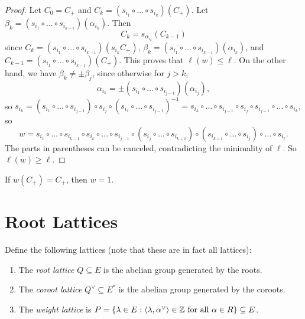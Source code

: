 \begin{proof}
  Let $C_0 = C_+$ and
  $C_k = (s_{i_1} \circ \dots \circ s_{i_k})(C_+)$.
  Let $\beta_k = (s_{i_1} \circ \dots \circ s_{i_{k - 1}})(\alpha_{i_k})$.
  Then
  \[
    C_k = s_{\alpha_{i_k}}(C_{k - 1})
  \]
  since
  $C_k = (s_{i_1} \circ \dots \circ s_{i_{k - 1}})(s_{i_k} C_+)$,
  $\beta_k = (s_{i_1} \circ \dots \circ s_{i_{k - 1}})(\alpha_{i_k})$,
  and $C_{k - 1} = (s_{i_1} \circ \dots \circ s_{i_{k - 1}})(C_+)$.
  This proves that
  $\ell(w) \le \ell$.
  On the other hand, we have
  $\beta_k \ne \pm \beta_j$, since
  otherwise for $j > k$,
  \[
    \alpha_{i_k}
    = \pm (s_{i_1} \circ \dots \circ s_{i_{j - 1}})(\alpha_{i_j}),
  \]
  so $s_{i_k} = (s_{i_1} \circ \dots \circ s_{i_{j - 1}}) \circ s_{i_j} \circ (s_{i_1} \circ \dots \circ s_{i_{j - 1}})^{-1} = s_{i_k} \circ \dots \circ s_{i_{j - 1}} \circ s_{i_j} \circ s_{i_{j - 1}} \circ \dots \circ s_{i_k}$, so
  \[
    w = s_{i_1} \circ \dots \circ s_{i_{k - 1}} \circ s_{i_{k}} \circ \dots \circ s_{i_{j - 1}} \circ (s_{i_j} \circ \dots \circ s_{i_{k + 1}}) \circ (s_{i_{k + 1}} \circ \dots \circ s_{i_j}) \circ \dots \circ s_{i_\ell}.
  \]
  The parts in parentheses can be
  canceled, contradicting the
  minimality of $\ell$.
  So $\ell(w) \ge \ell$.
\end{proof}

\begin{corollary}
  If $w(C_+) = C_+$, then $w = 1$.
\end{corollary}

\section{Root Lattices}
\begin{definition}
  Define the following lattices
  (note that these are in fact all
  lattices):
  \begin{enumerate}
    \item The \emph{root lattice} $Q \subseteq E$
      is the abelian group generated
      by the roots.
    \item The \emph{coroot lattice} $Q^\vee \subseteq E^*$
      is the abelian group generated
      by the coroots.
    \item The \emph{weight lattice} is
      $P = \{\lambda \in E : \langle\lambda, \alpha^\vee\rangle \in \mathbb{Z} \text{ for all $\alpha \in R$}\} \subseteq E$.
  \end{enumerate}
\end{definition}
